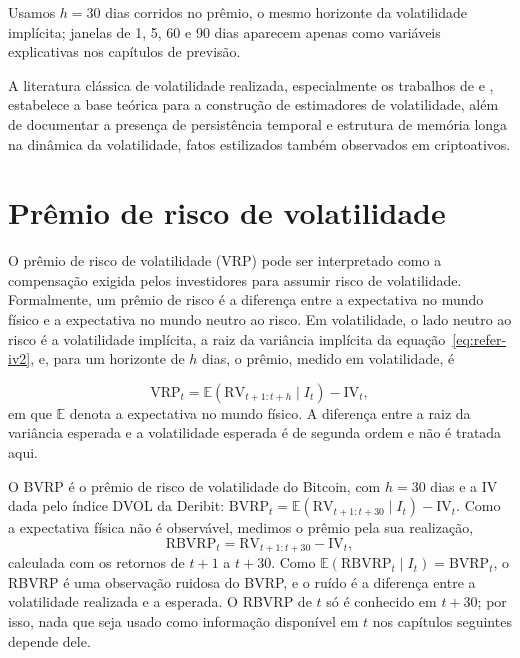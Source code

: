 Usamos $h = 30$ dias corridos no prêmio, o mesmo horizonte da
volatilidade implícita; janelas de 1, 5, 60 e 90 dias aparecem apenas como
variáveis explicativas nos capítulos de previsão.

A literatura clássica de volatilidade realizada, especialmente os trabalhos de
\citet{andersen2003realized} e \citet{corsi2009har}, estabelece a base teórica
para a construção de estimadores de volatilidade, além de documentar a
presença de persistência temporal e estrutura de memória longa na dinâmica da
volatilidade, fatos estilizados também observados em criptoativos.
\section{Prêmio de risco de volatilidade}
\label{sec:refer-vrp-teorico}

O prêmio de risco de volatilidade (VRP) pode ser interpretado como a
compensação exigida pelos investidores para assumir risco de volatilidade.
Formalmente, um prêmio de risco é a diferença entre a expectativa no mundo
físico e a expectativa no mundo neutro ao risco. Em volatilidade, o lado
neutro ao risco é a volatilidade implícita, a raiz da variância implícita da
equação~\eqref{eq:refer-iv2}, e, para um horizonte de $h$ dias, o prêmio,
medido em volatilidade, é

\begin{equation}
\text{VRP}_t = \mathbb{E}(\text{RV}_{t+1:t+h} \mid I_t) - \text{IV}_t,
\label{eq:refer-vrp-def}
\end{equation}
em que $\mathbb{E}$ denota a expectativa no mundo físico. A diferença entre a
raiz da variância esperada e a volatilidade esperada é de segunda ordem e não
é tratada aqui.

O BVRP é o prêmio de risco de volatilidade do Bitcoin, com $h = 30$ dias e a
IV dada pelo índice DVOL da Deribit:
$\text{BVRP}_t = \mathbb{E}(\text{RV}_{t+1:t+30} \mid I_t) - \text{IV}_t$. Como a
expectativa física não é observável, medimos o prêmio pela sua
realização,
\[
\text{RBVRP}_t = \text{RV}_{t+1:t+30} - \text{IV}_t,
\]
calculada com os retornos de $t+1$ a $t+30$. Como
$\mathbb{E}(\text{RBVRP}_t \mid I_t) = \text{BVRP}_t$, o RBVRP é uma observação
ruidosa do BVRP, e o ruído é a diferença entre a volatilidade realizada e a
esperada. O RBVRP de $t$ só é conhecido em $t+30$; por isso, nada que seja
usado como informação disponível em $t$ nos capítulos seguintes depende dele.

